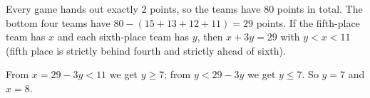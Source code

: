 Every game hands out exactly $2$ points, so the teams have $80$ points in total. The bottom four teams have $80-(15+13+12+11)=29$ points. If the fifth-place team has $x$ and each sixth-place team has $y$, then $x+3y=29$ with $y<x<11$ (fifth place is strictly behind fourth and strictly ahead of sixth).

From $x=29-3y<11$ we get $y\ge7$; from $y<29-3y$ we get $y\le7$. So $y=7$ and $x=\boxed{8}$.
